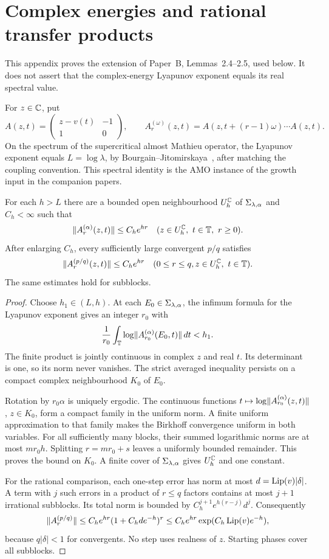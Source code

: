 \section{Complex energies and rational transfer products}\label{app:complex}
This appendix proves the extension of Paper~B, Lemmas~2.4--2.5, used below. It does not assert that the complex-energy Lyapunov exponent equals its real spectral value.

For $z\in\mathbb C$, put
\[
 A(z,t)=\begin{pmatrix}z-v(t)&-1\\1&0\end{pmatrix},\qquad
 A_r^{(\omega)}(z,t)=A(z,t+(r-1)\omega)\cdots A(z,t).
\]
On the spectrum of the supercritical almost Mathieu operator, the Lyapunov exponent equals $L=\log\lambda$, by Bourgain--Jitomirskaya~\cite[Corollary~2]{BourgainJitomirskaya2002}, after matching the coupling convention. This spectral identity is the AMO instance of the growth input in the companion papers.

\begin{lemma}\label{lem:complexgrowth}
For each $h>L$ there are a bounded open neighbourhood $U_h^{\mathbb C}$ of $\Sigma_{\lambda,\alpha}$ and $C_h<\infty$ such that
\[
 \lVert A_r^{(\alpha)}(z,t)\rVert\le C_he^{hr}
 \quad(z\in U_h^{\mathbb C},\ t\in\mathbb T,\ r\ge0).
\]
After enlarging $C_h$, every sufficiently large convergent $p/q$ satisfies
\begin{equation}\label{eq:complexrat}
 \lVert A_r^{(p/q)}(z,t)\rVert\le C_he^{hr}
 \quad(0\le r\le q, z\in U_h^{\mathbb C},\ t\in\mathbb T).
\end{equation}
The same estimates hold for subblocks.
\end{lemma}
\begin{proof}
Choose $h_1\in(L,h)$. At each $E_0\in\Sigma_{\lambda,\alpha}$, the infimum formula for the Lyapunov exponent gives an integer $r_0$ with
\[
 \frac1{r_0}\int_\mathbb T\log\lVert A_{r_0}^{(\alpha)}(E_0,t)\rVert\,dt<h_1.
\]
The finite product is jointly continuous in complex $z$ and real $t$. Its determinant is one, so its norm never vanishes. The strict averaged inequality persists on a compact complex neighbourhood $K_0$ of $E_0$.

Rotation by $r_0\alpha$ is uniquely ergodic. The continuous functions $t\mapsto\log\lVert A_{r_0}^{(\alpha)}(z,t)\rVert$, $z\in K_0$, form a compact family in the uniform norm. A finite uniform approximation to that family makes the Birkhoff convergence uniform in both variables. For all sufficiently many blocks, their summed logarithmic norms are at most $mr_0h$. Splitting $r=mr_0+s$ leaves a uniformly bounded remainder. This proves the bound on $K_0$. A finite cover of $\Sigma_{\lambda,\alpha}$ gives $U_h^{\mathbb C}$ and one constant.

For the rational comparison, each one-step error has norm at most $d=\operatorname{Lip}(v)|\delta|$. A term with $j$ such errors in a product of $r\le q$ factors contains at most $j+1$ irrational subblocks. Its total norm is bounded by $C_h^{j+1}e^{h(r-j)}d^j$. Consequently
\[
 \lVert A_r^{(p/q)}\rVert\le C_he^{hr}(1+C_hde^{-h})^r
 \le C_he^{hr}\exp(C_h\operatorname{Lip}(v)e^{-h}),
\]
because $q|\delta|<1$ for convergents. No step uses realness of $z$. Starting phases cover all subblocks.
\end{proof}

